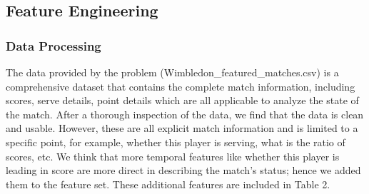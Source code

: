 \documentclass[12pt]{article}  %
\begin{document}
\subsection{Feature Engineering}

\subsubsection{Data Processing}
The data provided by the problem (Wimbledon\_featured\_matches.csv) is a comprehensive dataset that contains the complete match information, including scores, serve details, point details which are all applicable to analyze the state of the match. After a thorough inspection of the data, we find that the data is clean and usable. However, these are all explicit match information and is limited to a specific point, for example, whether this player is serving, what is the ratio of scores, etc. We think that more temporal features like whether this player is leading in score are more direct in describing the match’s status; hence we added them to the feature set. These additional features are included in Table 2.


\begin{table}[htbp]
	\centering  %
	\caption{Added Match Information}
\end{table}
\end{document}
